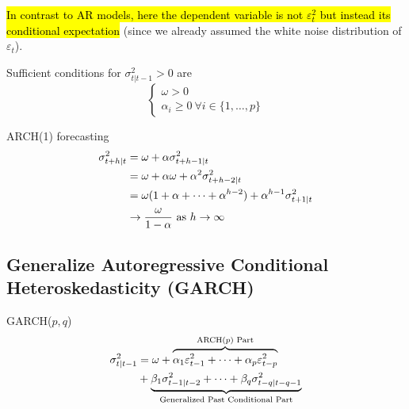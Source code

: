 \documentclass[11pt]{article}
\begin{document}
            \begin{remark}
                \hl{In contrast to AR models, here the dependent variable is not $\varepsilon_t^2$ but instead its conditional expectation} (since we already assumed the white noise distribution of $\varepsilon_t$).
            \end{remark}
            
            \begin{remark}
                Sufficient conditions for $\sigma_{t|t-1}^2 > 0$ are 
                \begin{equation}
                    \begin{cases}
                        \omega > 0 \\
                        \alpha_i \geq 0\ \forall i \in \{1, \dots, p\}
                    \end{cases}
                \end{equation}
            \end{remark}
            
            \begin{remark}
                ARCH(1) forecasting
                \begin{align}
                    \sigma_{t+h|t}^2 &= \omega + \alpha \sigma_{t+h-1|t}^2 \\
                    &= \omega + \alpha \omega + \alpha^2 \sigma_{t+h-2|t}^2 \\
                    &= \omega(1 + \alpha + \dots + \alpha^{h-2}) + \alpha^{h-1} \sigma_{t+1|t}^2 \\
                    &\to \frac{\omega}{1 - \alpha} \text{{ as }} h \to \infty
                \end{align}
            \end{remark}

        \subsection{Generalize Autoregressive Conditional Heteroskedasticity (GARCH)}
            \begin{definition}
                GARCH($p,q$)
                \begin{align}
                     \sigma_{t|t-1}^2 &= \omega + \overbrace{
                        \alpha_1 \varepsilon_{t-1}^2 + \cdots + \alpha_p \varepsilon_{t-p}^2
                     }^{\text{{ARCH($p$) Part}}} \\
                     &+ \underbrace{\beta_1 \sigma_{t-1|t-2}^2 + \cdots + \beta_q \sigma_{t-q|t-q-1}^2}_{\text{{Generalized Past Conditional Part}}}
                \end{align}
            \end{definition}
            
\end{document}
